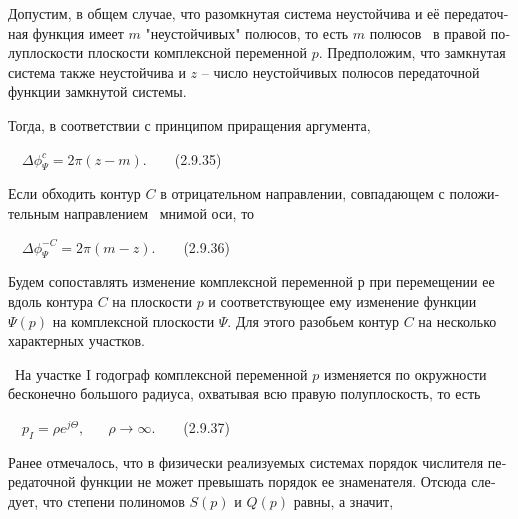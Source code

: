 \documentclass[a4paper]{article}
\begin{document}
{\begin{russian}\sffamily
Допустим, в общем случае, что разомкнутая система неустойчива и её передаточная функция имеет  $m$ "неустойчивых"
полюсов, то есть  $m$ полюсов \ в правой полуплоскости плоскости комплексной переменной  $p$. Предположим, что
замкнутая система также неустойчива и  $z$ – число неустойчивых полюсов передаточной функции замкнутой системы. 
\end{russian}}

{\begin{russian}\sffamily
Тогда, в соответствии с принципом приращения аргумента,
\end{russian}}

{\begin{russian}\sffamily
\ \  $\mathit{Δϕ}_Ψ^c=2π(z-m).$\ \ \ \ (2.9.35)
\end{russian}}

{\begin{russian}\sffamily
Если обходить контур  $C$ в отрицательном направлении, совпадающем с положительным направлением \ мнимой оси, то
\end{russian}}

{\begin{russian}\sffamily
\ \  $\mathit{Δϕ}_Ψ^{-C}=2π(m-z)$.\ \ \ \ (2.9.36)
\end{russian}}

{\begin{russian}\sffamily
Будем сопоставлять изменение комплексной переменной р при перемещении ее вдоль контура  $C$ на плоскости  $p$ и
соответствующее ему изменение функции \  $Ψ(p)$ на комплексной плоскости  $Ψ$. Для этого разобьем контур  $C$ на
несколько характерных участков.
\end{russian}}

{\begin{russian}\sffamily
\ На участке \textenglish{I} годограф комплексной переменной  $p$ изменяется по окружности бесконечно большого радиуса,
охватывая всю правую полуплоскость, то есть
\end{russian}}

{\begin{russian}\sffamily
\ \  $p_I=\mathit{ρe}^{\mathit{jΘ}},\;\;\;\;\;\;ρ\rightarrow \infty $.\ \ \ \ (2.9.37)
\end{russian}}

{\begin{russian}\sffamily
Ранее отмечалось, что в физически реализуемых системах порядок числителя передаточной функции не может превышать порядок
ее знаменателя. Отсюда следует, что степени полиномов  $S(p)$ и  $Q(p)$ равны, а значит, 
\end{russian}}
\end{document}
